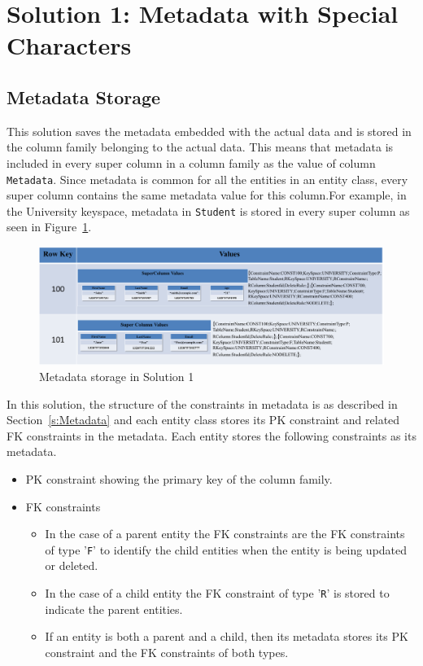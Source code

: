 \section{Solution 1:  Metadata with Special Characters}\label{s:sol1-real}

\subsection{Metadata Storage}
	This solution saves the metadata embedded with the actual data and is stored in
	the column family belonging to the actual data. This means that metadata is
	included in every super column in a column family as the value of column
	\texttt{Metadata}. Since metadata is common for all the entities in an entity
	class, every super column contains the same metadata value for this column.For
	example, in the University keyspace, metadata in \texttt{Student} is stored in
	every super column as seen in Figure~\ref{f:sol1-Student-md}.
	
		\begin{figure}[H]
			\centering
			\includegraphics[width=1\textwidth]{./figure/Solutions/Solution1-Student-MD.png}
			\caption{Metadata storage in Solution 1}\label{f:sol1-Student-md}
		\end{figure}
		
	In this solution, the structure of the constraints in metadata is as described
	in Section~\ref{s:Metadata} and each entity class stores  its \ac{PK}
	constraint and related \ac{FK} constraints in the metadata. 
	Each entity stores the following constraints as its metadata.
	
		\begin{itemize}
		  \item  \ac{PK} constraint showing the primary key of the column family.
		  \item \ac{FK} constraints 
				\begin{itemize}
					\item In the case of a parent entity the \ac{FK} constraints are the \ac{FK}
					constraints of type '\texttt{F}' to identify the child entities when the entity
					is being updated or deleted.
					\item  In the case of a child entity the \ac{FK} constraint of type '\texttt{R}'
					is stored to indicate the parent entities.
					\item If an entity is both a parent and a child, then its metadata
					stores its \ac{PK} constraint and the \ac{FK} constraints of both types.
				\end{itemize}
		\end{itemize}
		

